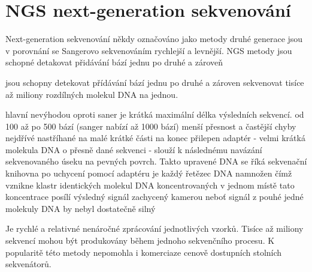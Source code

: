 \documentclass[czech,DP]{thesiskiv}
\begin{document}
 
\section{NGS next-generation sekvenování}
Next-generation sekvenování někdy označováno jako metody druhé generace jsou v porovnání se Sangerovo sekvenováním rychlejší a levnější. NGS metody jsou schopné detakovat přidávání bází jednu po druhé a zároveň  

 
jsou schopny detekovat přídávání bází jednu po druhé a zároven sekvenovat tisíce až miliony rozdílných molekul DNA na jednou. 

hlavní nevýhodou oproti saner je krátká maximální délka výsledních sekvencí. od 100 až po 500 bází (sanger nabízí až 1000 bází)
menší přesnost a častější chyby
nejdřívé nastříhané na malé krátké části na konec přilepen adaptér - velmi krátká molekula DNA o přesně dané sekvenci
- slouží k následnému navázání sekvenovaného úseku na pevných povrch. Takto upravené DNA se říká sekvenační knihovna
po uchycení pomocí adaptéru je každý řetězec DNA namnožen čímž vznikne klastr identických molekul DNA koncentrovaných v jednom místě
tato koncentrace posílí výsledný signál zachycený kamerou neboť signál z pouhé jedné molekuly DNA by nebyl dostatečně silný
 
Je rychlé a relativné nenáročné zprácování jednotlivých vzorků. Tisíce až miliony sekvencí mohou být produkovány během jednoho sekvenčního procesu. K popularitě této metody nepomohla i komerciaze cenově dostupních stolních sekvenátorů.
\end{document}
